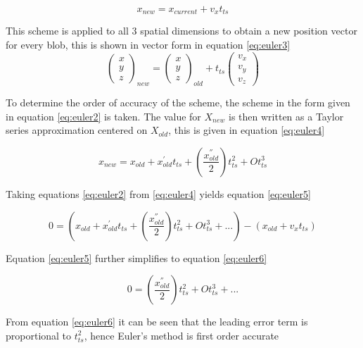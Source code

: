 \begin{equation}
\label{eq:euler2}
x_{new}=x_{current}+v_{x}t_{ts}
\end{equation}

This scheme is applied to all 3 spatial dimensions to obtain a new position vector for every blob, this is shown in vector form in equation \ref{eq:euler3}
\begin{equation}
\label{eq:euler3}
\begin{pmatrix}
x\\
y\\
z
\end{pmatrix}_{new}=\begin{pmatrix}
x\\
y\\
z
\end{pmatrix}_{old}+t_{ts}\begin{pmatrix}
v_x\\
v_y\\
v_z
\end{pmatrix}
\end{equation}

To determine the order of accuracy of the scheme, the scheme in the form given in equation \ref{eq:euler2} is taken. The value for $X_{new}$ is then written as a Taylor series approximation centered on $X_{old}$, this is given in equation \ref{eq:euler4}

\begin{equation}
\label{eq:euler4}
x_{new}=x_{old}+x_{old}^{'}t_{ts}+( \frac{x_{old}^{''}}{2})t_{ts}^2+Ot_{ts}^3
\end{equation}

Taking equations \ref{eq:euler2} from \ref{eq:euler4} yields equation \ref{eq:euler5} 

\begin{equation}
\label{eq:euler5}
0=(x_{old}+x_{old}^{'}t_{ts}+( \frac{x_{old}^{''}}{2})t_{ts}^2+Ot_{ts}^3+...)-(x_{old}+v_{x}t_{ts})
\end{equation}

Equation \ref{eq:euler5} further simplifies to equation \ref{eq:euler6}

\begin{equation}
\label{eq:euler6}
0=( \frac{x_{old}^{''}}{2})t_{ts}^2+Ot_{ts}^3+...
\end{equation}

From equation \ref{eq:euler6} it can be seen that the leading error term is proportional to $t_{ts}^2$, hence Euler's method is first order accurate

